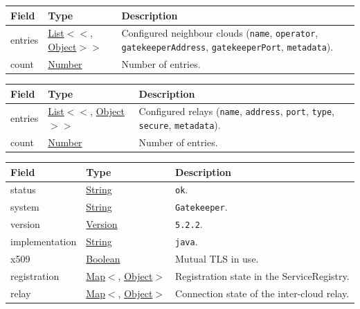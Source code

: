 \documentclass[a4paper]{arrowhead}
\newcommand{\pref}[1]{{\textcolor{ArrowheadGrey}{\hyperref[sec:model:primitives:#1]{#1}}}}
\begin{document}




\noindent\begin{tabularx}{\textwidth}{| >{\raggedright\arraybackslash}p{3.9cm} | >{\raggedright\arraybackslash\small}p{5.3cm} | X |} \hline
\rowcolor{gray!33} Field & Type & Description \\ \hline
entries & \pref{List}$<$\allowbreak{}\pref{Map}$<$\allowbreak{}\pref{String}, \pref{Object}$>$$>$ & Configured neighbour clouds (\texttt{name}, \texttt{operator}, \texttt{gatekeeperAddress}, \texttt{gatekeeperPort}, \texttt{metadata}). \\ \hline
count & \pref{Number} & Number of entries. \\ \hline
\end{tabularx}







\noindent\begin{tabularx}{\textwidth}{| >{\raggedright\arraybackslash}p{3.9cm} | >{\raggedright\arraybackslash\small}p{5.3cm} | X |} \hline
\rowcolor{gray!33} Field & Type & Description \\ \hline
entries & \pref{List}$<$\allowbreak{}\pref{Map}$<$\allowbreak{}\pref{String}, \pref{Object}$>$$>$ & Configured relays (\texttt{name}, \texttt{address}, \texttt{port}, \texttt{type}, \texttt{secure}, \texttt{metadata}). \\ \hline
count & \pref{Number} & Number of entries. \\ \hline
\end{tabularx}







\noindent\begin{tabularx}{\textwidth}{| >{\raggedright\arraybackslash}p{3.9cm} | >{\raggedright\arraybackslash\small}p{5.3cm} | X |} \hline
\rowcolor{gray!33} Field & Type & Description \\ \hline
status & \pref{String} & \texttt{ok}. \\ \hline
system & \pref{String} & \texttt{Gatekeeper}. \\ \hline
version & \pref{Version} & \texttt{5.\allowbreak{}2.\allowbreak{}2}. \\ \hline
implementation & \pref{String} & \texttt{java}. \\ \hline
x509 & \pref{Boolean} & Mutual TLS in use. \\ \hline
registration & \pref{Map}$<$\allowbreak{}\pref{String}, \pref{Object}$>$ & Registration state in the ServiceRegistry. \\ \hline
relay & \pref{Map}$<$\allowbreak{}\pref{String}, \pref{Object}$>$ & Connection state of the inter-cloud relay. \\ \hline
\end{tabularx}
\end{document}
